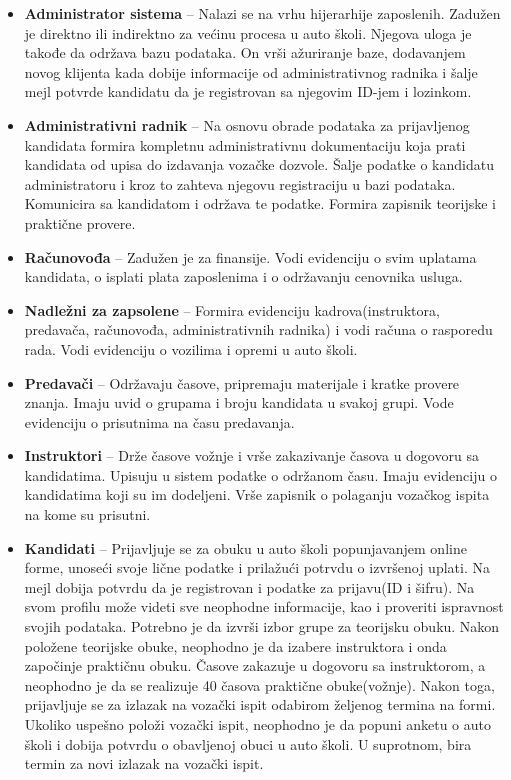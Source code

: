 \begin{itemize}
\item \textbf{Administrator sistema} – Nalazi se na vrhu hijerarhije zaposlenih. Zadužen je direktno ili indirektno za većinu procesa u auto školi. Njegova uloga je takođe da održava bazu podataka. On vrši ažuriranje baze, dodavanjem novog klijenta kada dobije informacije od administrativnog radnika i šalje mejl potvrde kandidatu da je registrovan sa njegovim ID-jem i lozinkom.
\item \textbf{Administrativni radnik} – Na osnovu obrade podataka za prijavljenog kandidata formira kompletnu administrativnu dokumentaciju koja prati kandidata od upisa do izdavanja vozačke dozvole. Šalje podatke o kandidatu administratoru i kroz to zahteva njegovu registraciju u bazi podataka. Komunicira sa kandidatom i održava te podatke. Formira zapisnik teorijske i praktične provere.
\item \textbf{Računovođa} – Zadužen je za finansije. Vodi evidenciju o svim uplatama kandidata, o isplati plata zaposlenima i o održavanju cenovnika usluga.
\item \textbf{Nadležni za zapsolene} – Formira evidenciju kadrova(instruktora, predavača, računovođa, administrativnih radnika) i vodi računa o rasporedu rada. Vodi evidenciju o vozilima i opremi u auto školi.
\item \textbf{Predavači} – Održavaju časove, pripremaju materijale i kratke provere znanja. Imaju uvid o grupama i broju kandidata u svakoj grupi. Vode evidenciju o prisutnima na času predavanja.
\item \textbf{Instruktori} – Drže časove vožnje i vrše zakazivanje časova u dogovoru sa kandidatima. Upisuju u sistem podatke o održanom času. Imaju evidenciju o kandidatima koji su im dodeljeni. Vrše zapisnik o polaganju vozačkog ispita na kome su prisutni.
\item \textbf{Kandidati} – Prijavljuje se za obuku u auto školi  popunjavanjem online forme, unoseći svoje lične podatke i prilažući potrvdu o izvršenoj uplati. Na mejl dobija potvrdu da je registrovan i podatke za prijavu(ID i šifru). Na svom profilu može videti sve neophodne informacije, kao i proveriti ispravnost svojih podataka. Potrebno je da izvrši izbor grupe za teorijsku obuku. Nakon položene teorijske obuke, neophodno je da izabere instruktora i onda započinje praktičnu obuku. Časove zakazuje u dogovoru sa instruktorom, a neophodno je da se realizuje 40 časova praktične obuke(vožnje). Nakon toga, prijavljuje se za izlazak na vozački ispit odabirom željenog termina na formi. Ukoliko uspešno položi vozački ispit, neophodno je da popuni anketu o auto školi i dobija potvrdu o obavljenoj obuci u auto školi. U suprotnom, bira termin za novi izlazak na vozački ispit. 
\end{itemize}
